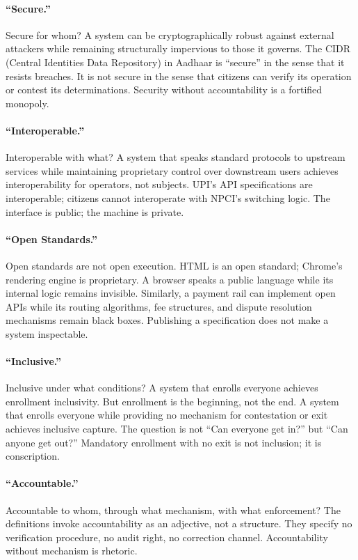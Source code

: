 \documentclass{article}
\begin{document}
\paragraph{``Secure.''}  Secure for whom? A system can be cryptographically robust against external attackers while remaining structurally impervious to those it governs. The CIDR (Central Identities Data Repository) in Aadhaar is ``secure'' in the sense that it resists breaches. It is not secure in the sense that citizens can verify its operation or contest its determinations. Security without accountability is a fortified monopoly.

\paragraph{``Interoperable.''}  Interoperable with what? A system that speaks standard protocols to upstream services while maintaining proprietary control over downstream users achieves interoperability for operators, not subjects. UPI's API specifications are interoperable; citizens cannot interoperate with NPCI's switching logic. The interface is public; the machine is private.

\paragraph{``Open Standards.''}  Open standards are not open execution. HTML is an open standard; Chrome's rendering engine is proprietary. A browser speaks a public language while its internal logic remains invisible. Similarly, a payment rail can implement open APIs while its routing algorithms, fee structures, and dispute resolution mechanisms remain black boxes. Publishing a specification does not make a system inspectable.

\paragraph{``Inclusive.''}  Inclusive under what conditions? A system that enrolls everyone achieves enrollment inclusivity. But enrollment is the beginning, not the end. A system that enrolls everyone while providing no mechanism for contestation or exit achieves inclusive capture. The question is not ``Can everyone get in?'' but ``Can anyone get out?'' Mandatory enrollment with no exit is not inclusion; it is conscription.

\paragraph{``Accountable.''}  Accountable to whom, through what mechanism, with what enforcement? The definitions invoke accountability as an adjective, not a structure. They specify no verification procedure, no audit right, no correction channel. Accountability without mechanism is rhetoric.
\end{document}
